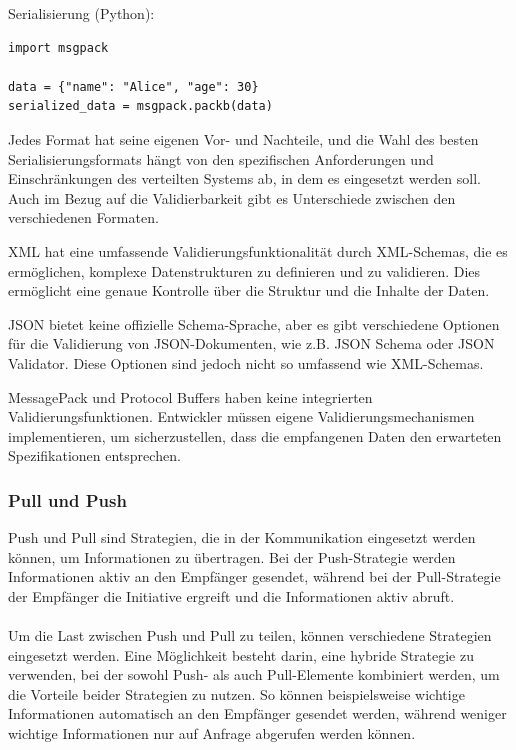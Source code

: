 \documentclass[../vs-script-first-v01.tex]{subfiles}
\begin{document}
Serialisierung (Python):\\
\begin{lstlisting}[caption={MessagePack},captionpos=b,label={lst:msgpack}]
import msgpack

data = {"name": "Alice", "age": 30}
serialized_data = msgpack.packb(data)
\end{lstlisting}
Jedes Format hat seine eigenen Vor- und Nachteile, und die Wahl des besten Serialisierungsformats hängt von den spezifischen Anforderungen und Einschränkungen des verteilten Systems ab, in dem es eingesetzt werden soll.
Auch im Bezug auf die Validierbarkeit gibt es Unterschiede zwischen den verschiedenen Formaten.

XML hat eine umfassende Validierungsfunktionalität durch XML-Schemas, die es ermöglichen, komplexe Datenstrukturen zu definieren und zu validieren. Dies ermöglicht eine genaue Kontrolle über die Struktur und die Inhalte der Daten.

JSON bietet keine offizielle Schema-Sprache, aber es gibt verschiedene Optionen für die Validierung von JSON-Dokumenten, wie z.B. JSON Schema oder JSON Validator. Diese Optionen sind jedoch nicht so umfassend wie XML-Schemas.

MessagePack und Protocol Buffers haben keine integrierten Validierungsfunktionen. Entwickler müssen eigene Validierungsmechanismen implementieren, um sicherzustellen, dass die empfangenen Daten den erwarteten Spezifikationen entsprechen.

\subsubsection{Pull und Push}

Push und Pull sind Strategien, die in der Kommunikation eingesetzt werden können, um Informationen zu übertragen. Bei der Push-Strategie werden Informationen aktiv an den Empfänger gesendet, während bei der Pull-Strategie der Empfänger die Initiative ergreift und die Informationen aktiv abruft.
\\\\
Um die Last zwischen Push und Pull zu teilen, können verschiedene Strategien eingesetzt werden. Eine Möglichkeit besteht darin, eine hybride Strategie zu verwenden, bei der sowohl Push- als auch Pull-Elemente kombiniert werden, um die Vorteile beider Strategien zu nutzen. So können beispielsweise wichtige Informationen automatisch an den Empfänger gesendet werden, während weniger wichtige Informationen nur auf Anfrage abgerufen werden können.
\end{document}
